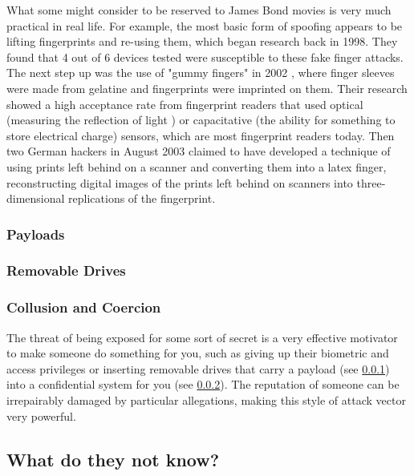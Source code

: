 \documentclass[a4paper, 11pt]{article}
\begin{document}
What some might consider to be reserved to James Bond movies is very much practical in real life. For example, the most basic form of spoofing appears to be lifting fingerprints and re-using them, which began research back in 1998. \cite{ref:biometricattackvectors} \cite{ref:willis1998six} They found that 4 out of 6 devices tested were susceptible to these fake finger attacks. \cite{ref:willis1998six} The next step up was the use of "gummy fingers" in 2002 \cite{ref:matsumoto2002impact}, where finger sleeves were made from gelatine and fingerprints were imprinted on them. Their research showed a high acceptance rate from fingerprint readers that used optical (measuring the reflection of light \cite{ref:matsumoto2002impact}) or capacitative (the ability for something to store electrical charge) sensors, which are most fingerprint readers today. \cite{ref:matsumoto2002impact} Then two German hackers in August 2003 claimed to have developed a technique of using prints left behind on a scanner and converting them into a latex finger, reconstructing digital images of the prints left behind on scanners into three-dimensional replications of the fingerprint. \cite{ref:biometricattackvectors} \cite{ref:harrison2003hackers}

\subsubsection{Payloads}
\label{sec:payloads}

\subsubsection{Removable Drives}
\label{sec:removabledrives}

\subsubsection{Collusion and Coercion}
\label{sec:coercion}
The threat of being exposed for some sort of secret is a very effective motivator to make someone do something for you, such as giving up their biometric and access privileges \cite{ref:biometricattackvectors} or inserting removable drives that carry a payload (see \ref{sec:payloads}) into a confidential system for you (see \ref{sec:removabledrives}). The reputation of someone can be irrepairably damaged by particular allegations, \cite{ref:biometricattackvectors} making this style of attack vector very powerful.

\subsection{What do they not know?}
\end{document}
